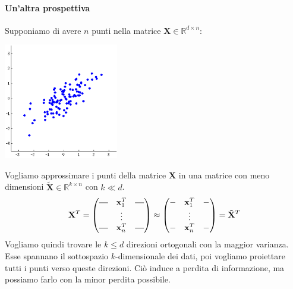 \documentclass{article}
\newcommand*{\horzbar}{\rule[.5ex]{2.5ex}{0.5pt}}
\begin{document}
        \paragraph{Un'altra prospettiva} Supponiamo di avere $n$ punti nella matrice 
        $\mathbf{X} \in \mathbb{R}^{d \times n}$:
        \begin{center}\includegraphics[width=5cm]{points.png}\end{center}
        Vogliamo approssimare i punti della matrice $\mathbf{X}$ in una matrice con meno dimensioni $\mathbf{\tilde{X}} \in \mathbb{R}^{k \times n}$
        con $k \ll d$. 
        \[ \mathbf{X}^T = \begin{pmatrix}
            \horzbar & \mathbf{x}_1^T & \horzbar \\
            & \vdots & \\
            \horzbar & \mathbf{x}_n^T & \horzbar
        \end{pmatrix} \approx
        \begin{pmatrix}
            - & \mathbf{x}_1^T & - \\
            & \vdots & \\
            - & \mathbf{x}_n^T & -
        \end{pmatrix} = \mathbf{\tilde{X}}^T\]
        Vogliamo quindi trovare le $k \leq d$ direzioni ortogonali con la maggior varianza. Esse spannano il sottospazio $k$-dimensionale 
        dei dati, poi vogliamo proiettare tutti i punti verso queste direzioni. Ciò induce a perdita di informazione, ma possiamo 
        farlo con la minor perdita possibile.
\end{document}
